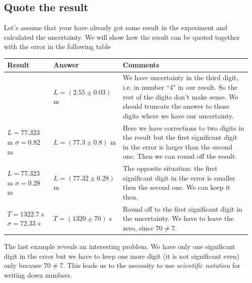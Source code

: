 \documentclass[12pt,a4paper]{article}
\begin{document}
\subsection{Quote the result}
Let's assume that your have already got some result in the experiment and calculated the uncertainty. We will show how the result can be quoted together with the error in the following table

\begin{center}
  \begin{tabular}{| p{2.7cm}|  p{3.9cm} | p{9cm} | }
    \hline
    Result & Answer & Comments\\ \hline  \hline
    \vspace{0.4 cm}{$ L = 2.5492$ m $\sigma = 0.03$ m} &\vspace{0.5 cm}$L = (2.55 \pm 0.03)$ m & We have uncertainty in the third digit, i.e. in number ``4" in our result. So the rest of the digits don't make sense. We should truncate the answer to those digits where we have our uncertainty. \\ \hline
    \vspace{0.4 cm}$ L = 77.323$ m  $\sigma = 0.82$ m & \vspace{0.5 cm}$L = (77.3 \pm 0.8)$ m & Here we have corrections to two digits in the result but the first significant digit in the error is larger than the second one. Then we can round off the result. \\ \hline
      \vspace{0.4 cm}$ L = 77.323$ m\;\;  $\sigma = 0.28$ m& \vspace{0.5 cm}$L = (77.32 \pm 0.28)$ m & The opposite situation: the first significant digit in the error is  smaller then the second one. We can keep it then.\\ \hline
   \vspace{0.4 cm}$ T = 1322.7$ s\;\;  $\sigma = 72.33$ s & \vspace{0.5 cm}$T = (1320 \pm 70)$ s & Round off to the first significant digit in the uncertainty. We have to leave the zero, since $70\neq7$.\\ \hline

  \end{tabular}
\end{center}

The last example reveals an interesting problem. We have only one significant digit in the error but we have to keep one more digit (it is not significant even) only because $70\neq7$. This leads us to the necessity to use \textit{scientific notation} for writing down numbers.
\end{document}
